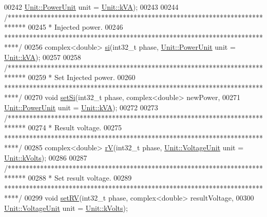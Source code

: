 \begin{DoxyCode}
00242              \hyperlink{class_unit_ace265ae255370ccacfd5370337572c3b}{Unit::PowerUnit} unit = \hyperlink{class_unit_ace265ae255370ccacfd5370337572c3ba72b181a842ae2759488a2fa1410d3696}{Unit::kVA});
00243 
00244   \textcolor{comment}{/*****************************************************************************}
00245 \textcolor{comment}{   * Injected power.}
00246 \textcolor{comment}{   ****************************************************************************/}
00256   complex<double> \hyperlink{group___models_ga02bbc279f1e133f66b12ee21e7bebcd8}{si}(int32\_t phase, \hyperlink{class_unit_ace265ae255370ccacfd5370337572c3b}{Unit::PowerUnit} unit = 
      \hyperlink{class_unit_ace265ae255370ccacfd5370337572c3ba72b181a842ae2759488a2fa1410d3696}{Unit::kVA});
00257 
00258   \textcolor{comment}{/*****************************************************************************}
00259 \textcolor{comment}{   * Set Injected power.}
00260 \textcolor{comment}{   ****************************************************************************/}
00270   \textcolor{keywordtype}{void} \hyperlink{group___models_ga74e510be49e50e4c14550b32e1dc92f9}{setSi}(int32\_t phase, complex<double> newPower,
00271              \hyperlink{class_unit_ace265ae255370ccacfd5370337572c3b}{Unit::PowerUnit} unit = \hyperlink{class_unit_ace265ae255370ccacfd5370337572c3ba72b181a842ae2759488a2fa1410d3696}{Unit::kVA});
00272 
00273   \textcolor{comment}{/*****************************************************************************}
00274 \textcolor{comment}{   * Result voltage.}
00275 \textcolor{comment}{   ****************************************************************************/}
00285   complex<double> \hyperlink{group___models_ga2d1f6bfbd8abaf168bb75bd8e5cd9b5e}{rV}(int32\_t phase, \hyperlink{class_unit_a55b07dfa9457e1eca2c7194fe0cfc3c1}{Unit::VoltageUnit} unit = 
      \hyperlink{class_unit_a55b07dfa9457e1eca2c7194fe0cfc3c1aa54b2473993a702a3923525765bd6e4c}{Unit::kVolts});
00286 
00287   \textcolor{comment}{/*****************************************************************************}
00288 \textcolor{comment}{   * Set result voltage.}
00289 \textcolor{comment}{   ****************************************************************************/}
00299   \textcolor{keywordtype}{void} \hyperlink{group___models_ga2b2c5a373d87025e79d26aa9c4cea75a}{setRV}(int32\_t phase, complex<double> resultVoltage,
00300              \hyperlink{class_unit_a55b07dfa9457e1eca2c7194fe0cfc3c1}{Unit::VoltageUnit} unit = \hyperlink{class_unit_a55b07dfa9457e1eca2c7194fe0cfc3c1aa54b2473993a702a3923525765bd6e4c}{Unit::kVolts});

\end{DoxyCode}
